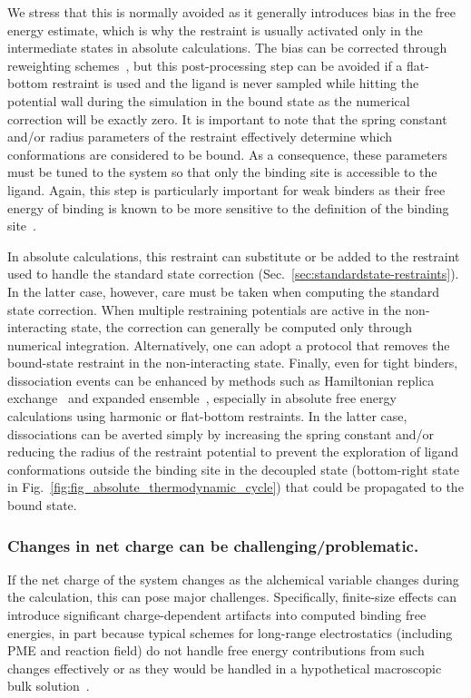 \documentclass[9pt,bestpractices]{livecoms}
\begin{document}
We stress that this is normally avoided as it generally introduces bias in the free energy estimate, which is why the restraint is usually activated only in the intermediate states in absolute calculations.
The bias can be corrected through reweighting schemes~\cite{rizzi2019sampl6}, but this post-processing step can be avoided if a flat-bottom restraint is used and the ligand is never sampled while hitting the potential wall during the simulation in the bound state as the numerical correction will be exactly zero.
It is important to note that the spring constant and/or radius parameters of the restraint effectively determine which conformations are considered to be bound.
As a consequence, these parameters must be tuned to the system so that only the binding site is accessible to the ligand.
Again, this step is particularly important for weak binders as their free energy of binding is known to be more sensitive to the definition of the binding site~\cite{gilson1997statisticalthermodynamic}.

In absolute calculations, this restraint can substitute or be added to the restraint used to handle the standard state correction (Sec.~\ref{sec:standardstate-restraints}).
In the latter case, however, care must be taken when computing the standard state correction.
When multiple restraining potentials are active in the non-interacting state, the correction can generally be computed only through numerical integration.
Alternatively, one can adopt a protocol that removes the bound-state restraint in the non-interacting state.
Finally, even for tight binders, dissociation events can be enhanced by methods such as Hamiltonian replica exchange~\cite{sugita2000multidimensionala,chodera2011replica,wang2013identifying} and expanded ensemble~\cite{lyubartsev1992newa,li2007simulated}, especially in absolute free energy calculations using harmonic or flat-bottom restraints.
In the latter case, dissociations can be averted simply by increasing the spring constant and/or reducing the radius of the restraint potential to prevent the exploration of ligand conformations outside the binding site in the decoupled state (bottom-right state in Fig.~\ref{fig:fig_absolute_thermodynamic_cycle}) that could be propagated to the bound state.

\subsubsection{Changes in net charge can be challenging/problematic.}
If the net charge of the system changes as the alchemical variable changes during the  calculation, this can pose major challenges.
Specifically, finite-size effects can introduce significant charge-dependent artifacts into computed binding free energies, in part because typical schemes for long-range electrostatics (including PME and reaction field) do not handle free energy contributions from such changes effectively or as they would be handled in a hypothetical macroscopic bulk solution~\cite{lin2014overview, ohlknecht2020correcting, rocklin2013calculating}.
\end{document}
